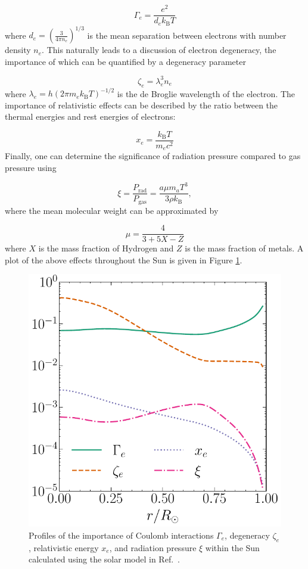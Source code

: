 \documentclass[12pt]{article}
\begin{document}
\begin{equation}
    \Gamma_e = \frac{e^2}{d_e k_\mathrm{B}T}
\end{equation}
%
where $d_e = \left(\frac{3}{4\pi n_e}\right)^{1/3}$ is the mean separation between electrons with number density $n_e$. This naturally leads to a discussion of electron degeneracy, the importance of which can be quantified by a degeneracy parameter

\begin{equation}
    \zeta_e = \lambda_e^3 n_e
\end{equation}
%
where $\lambda_e = h \left(2\pi m_e k_\mathrm{B}T\right)^{-1/2}$ is the de Broglie wavelength of the electron. The importance of relativistic effects can be described by the ratio between the thermal energies and rest energies of electrons:

\begin{equation}
    x_e = \frac{k_\mathrm{B}T}{m_e c^2}
\end{equation}
%
Finally, one can determine the significance of radiation pressure compared to gas pressure using

\begin{equation}
    \xi = \frac{P_\mathrm{rad}}{P_\mathrm{gas}} = \frac{a\mu m_a T^3}{3\rho k_\mathrm{B}},
\end{equation}
%
where the mean molecular weight can be approximated \cite{Christensen_Dalsgaard_2021} by

\begin{equation}
    \mu = \frac{4}{3 + 5X - Z}
\end{equation}
%
where $X$ is the mass fraction of Hydrogen and $Z$ is the mass fraction of metals. A plot of the above effects throughout the Sun is given in Figure \ref{fig:weird_stuff}.

\begin{figure}[H]
    \centering
    \includegraphics[width=0.5\linewidth]{Solar Model Images/weird_stuff.pdf}
    \caption{Profiles of the importance of Coulomb interactions $\Gamma_e$, degeneracy $\zeta_e$, relativistic energy $x_e$, and radiation pressure $\xi$ within the Sun calculated using the solar model in Ref.~\cite{Bahcall_2005}.}
    \label{fig:weird_stuff}
\end{figure}
\end{document}
